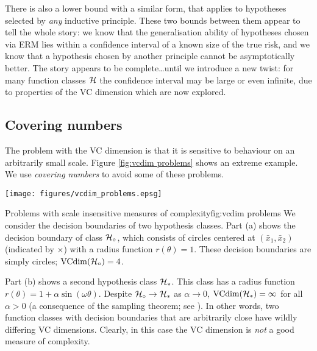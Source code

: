 There is also a lower bound with a similar form, that applies to
hypotheses selected by \emph{any} inductive principle.  These two
bounds between them appear to tell the whole story: we know that the
generalisation ability of hypotheses chosen via ERM lies within a
confidence interval of a known size of the true risk, and we know that
a hypothesis chosen by another principle cannot be asymptotically
better.  The story appears to be complete\ldots until we introduce a
new twist: for many function classes $\mathcal{H}$ the confidence interval
may be large or even infinite, due to properties of the VC dimension
which are now explored. 

\subsection{Covering numbers}
\label{sec:covering numbers}

The problem with the VC dimension is that it is sensitive to behaviour
on an arbitrarily small scale.  Figure \ref{fig:vcdim problems} shows
an extreme example.  We use \emph{covering numbers} to avoid some of
these problems.

\begin{linefigure}
\begin{center}
\texttt{[image: figures/vcdim\_problems.epsg]}
\end{center}
\begin{capt}{Problems with scale insensitive measures of
complexity}{fig:vcdim problems}
We consider the decision boundaries of two hypothesis classes.  Part
(a) shows the decision boundary of class $\mathcal{H}_{\circ}$,
which consists of circles centered at $(\bar{x}_1, \bar{x}_2)$
(indicated by $\times$) with a radius function $r(\theta) = 1$.  These
decision boundaries are simply circles; $\mathrm{VCdim}(\mathcal{H}_{\circ}) = 4$.

Part (b) shows a second hypothesis class $\mathcal{H}_{\ast}$.  This class
has a radius function $r(\theta) = 1 + \alpha \sin(\omega \theta)$.
Despite $\mathcal{H}_{\circ} \rightarrow \mathcal{H}_{\ast}$ as $\alpha
\rightarrow 0$, $\mathrm{VCdim}(\mathcal{H}_{\ast}) = \infty$ for all $\alpha >
0$ (a consequence of the sampling theorem; see \cite{Cherkassky98}).
In other words, two function classes with 
decision boundaries that are arbitrarily close have wildly differing
VC dimensions.  Clearly, in this case the VC dimension is \emph{not} a
good measure of complexity.
\end{capt}
\end{linefigure}

